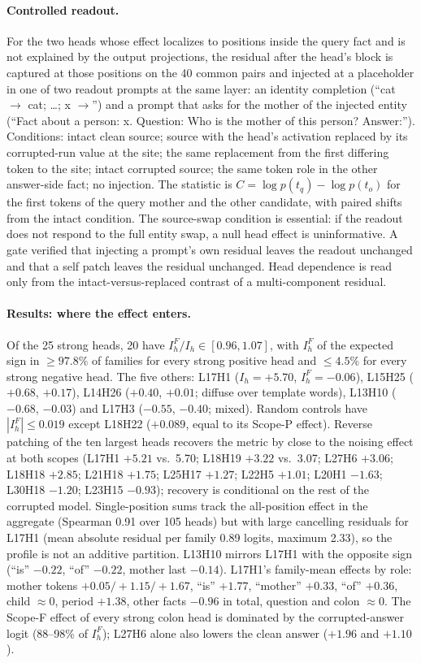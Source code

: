 \paragraph{Controlled readout.}
For the two heads whose effect localizes to positions inside the query fact and is
not explained by the output projections, the residual after the head's block is
captured at those positions on the 40 common pairs and injected at a placeholder in
one of two readout prompts at the same layer: an identity completion (``cat $\to$
cat; \ldots; x $\to$'') and a prompt that asks for the mother of the injected entity
(``Fact about a person: x. Question: Who is the mother of this person? Answer:'').
Conditions: intact clean source; source with the head's activation replaced by its
corrupted-run value at the site; the same replacement from the first differing token
to the site; intact corrupted source; the same token role in the other answer-side
fact; no injection. The statistic is $C=\log p(t_q)-\log p(t_o)$ for the first
tokens of the query mother and the other candidate, with paired shifts from the
intact condition. The source-swap condition is essential: if the readout does not
respond to the full entity swap, a null head effect is uninformative. A gate
verified that injecting a prompt's own residual leaves the readout unchanged and
that a self patch leaves the residual unchanged. Head dependence is read only from
the intact-versus-replaced contrast of a multi-component residual.

\paragraph{Results: where the effect enters.}
Of the 25 strong heads, 20 have $I^F_h/I_h\in[0.96,1.07]$, with $I^F_h$ of the
expected sign in $\ge97.8\%$ of families for every strong positive head and
$\le4.5\%$ for every strong negative head. The five others: L17H1 ($I_h=+5.70$,
$I^F_h=-0.06$), L15H25 ($+0.68$, $+0.17$), L14H26 ($+0.40$, $+0.01$; diffuse over
template words), L13H10 ($-0.68$, $-0.03$) and L17H3 ($-0.55$, $-0.40$; mixed).
Random controls have $|I^F_h|\le0.019$ except L18H22 ($+0.089$, equal to its Scope-P
effect). Reverse patching of the ten largest heads recovers the metric by close to the
noising effect at both scopes (L17H1 $+5.21$ vs.\ 5.70; L18H19 $+3.22$ vs.\ 3.07;
L27H6 $+3.06$; L18H18 $+2.85$; L21H18 $+1.75$; L25H17 $+1.27$; L22H5 $+1.01$; L20H1
$-1.63$; L30H18 $-1.20$; L23H15 $-0.93$); recovery is conditional on the rest of the
corrupted model. Single-position sums track the all-position effect in the aggregate
(Spearman 0.91 over 105 heads) but with large cancelling residuals for L17H1 (mean
absolute residual per family 0.89 logits, maximum 2.33), so the profile is not an
additive partition. L13H10 mirrors L17H1 with the opposite sign (``is'' $-0.22$, ``of'' $-0.22$, mother last $-0.14$). L17H1's family-mean effects by role: mother tokens $+0.05/+1.15/
+1.67$, ``is'' $+1.77$, ``mother'' $+0.33$, ``of'' $+0.36$, child $\approx0$, period
$+1.38$, other facts $-0.96$ in total, question and colon $\approx0$. The Scope-F
effect of every strong colon head is dominated by the corrupted-answer logit (88--98\%
of $I^F_h$); L27H6 alone also lowers the clean answer ($+1.96$ and $+1.10$).

